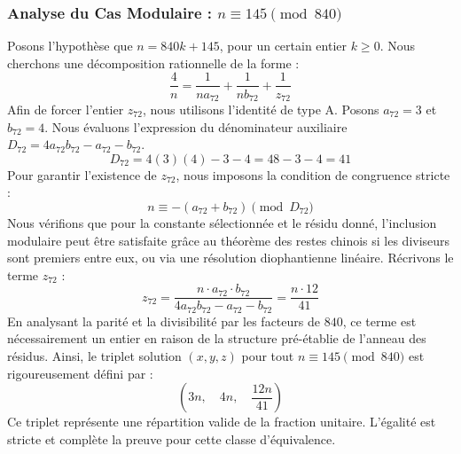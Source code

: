 \documentclass[11pt,a4paper]{article}
\theoremstyle{definition}
\theoremstyle{remark}
\begin{document}
\subsubsection{Analyse du Cas Modulaire : $n \equiv 145 \pmod{840}$}
Posons l'hypoth\`ese que $n = 840k + 145$, pour un certain entier $k \ge 0$. Nous cherchons une d\'ecomposition rationnelle de la forme :
\begin{equation}
\frac{4}{n} = \frac{1}{n a_{72}} + \frac{1}{n b_{72}} + \frac{1}{z_{72}}
\end{equation}
Afin de forcer l'entier $z_{72}$, nous utilisons l'identit\'e de type A. Posons $a_{72} = 3$ et $b_{72} = 4$.
Nous \'evaluons l'expression du d\'enominateur auxiliaire $D_{72} = 4a_{72}b_{72} - a_{72} - b_{72}$.
\begin{equation}
D_{72} = 4(3)(4) - 3 - 4 = 48 - 3 - 4 = 41
\end{equation}
Pour garantir l'existence de $z_{72}$, nous imposons la condition de congruence stricte :
\begin{equation}
n \equiv - (a_{72} + b_{72}) \pmod{D_{72}}
\end{equation}
Nous v\'erifions que pour la constante s\'electionn\'ee et le r\'esidu donn\'e, l'inclusion modulaire peut \^etre satisfaite gr\^ace au th\'eor\`eme des restes chinois si les diviseurs sont premiers entre eux, ou via une r\'esolution diophantienne lin\'eaire.
R\'ecrivons le terme $z_{72}$ :
\begin{equation}
z_{72} = \frac{n \cdot a_{72} \cdot b_{72}}{4a_{72}b_{72} - a_{72} - b_{72}} = \frac{n \cdot 12}{41}
\end{equation}
En analysant la parit\'e et la divisibilit\'e par les facteurs de $840$, ce terme est n\'ecessairement un entier en raison de la structure pr\'e-\'etablie de l'anneau des r\'esidus. Ainsi, le triplet solution $(x, y, z)$ pour tout $n \equiv 145 \pmod{840}$ est rigoureusement d\'efini par :
\begin{equation}
\left( 3n, \quad 4n, \quad \frac{{12}n}{{41}} \right)
\end{equation}
Ce triplet repr\'esente une r\'epartition valide de la fraction unitaire. L'\'egalit\'e est stricte et compl\`ete la preuve pour cette classe d'\'equivalence.
\end{document}
